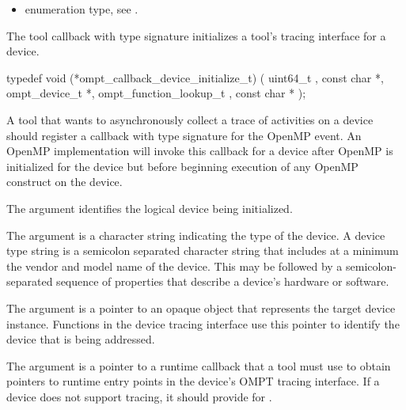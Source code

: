 \codeptrdesc

\crossreferences
\begin{itemize}
\item {} enumeration type, see .
\end{itemize}


\label{sec:ompt_callback_device_initialize_t}

\summary The tool callback with type signature
 initializes a
tool's tracing interface for a device.

\format

\begin{ccppspecific}
\begin{omptCallback}
typedef void (*ompt_callback_device_initialize_t) (
  uint64_t ,
  const char *,
  ompt_device_t *,
  ompt_function_lookup_t ,
  const char *
);
\end{omptCallback}
\end{ccppspecific}


\descr

A tool that wants to asynchronously collect a trace of
activities on a device should register a callback with type signature
 for the
 OpenMP event. An OpenMP
implementation will invoke this callback for a device after OpenMP is
initialized for the device but before beginning execution of any
OpenMP construct on the device.

\argdesc

The argument  identifies the logical device
being initialized.

The argument  is a character string indicating the
type of the device. A device type string is a semicolon separated
character string that includes at a minimum the vendor and model name
of the device. This may be followed by a semicolon-separated sequence
of properties that describe a device's hardware or software.

The  argument is a pointer to an opaque object that
represents the target device instance. Functions in the device
tracing interface use this pointer to identify the device that
is being addressed.

The argument  is a pointer to a runtime callback
that a tool must use to obtain pointers to runtime entry points in the
device's OMPT tracing interface. If a device does not support tracing,
it should provide  for .

